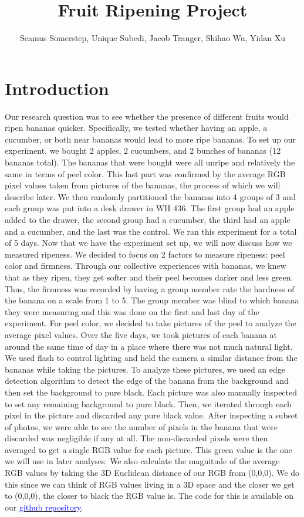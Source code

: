 \documentclass[
  12pt,
]{article}
\title{Fruit Ripening Project}
\author{Seamus Somerstep, Unique Subedi, Jacob Trauger, Shihao Wu, Yidan
Xu}
\date{}
\begin{document}
\maketitle

\hypertarget{introduction}{%
\section{Introduction}\label{introduction}}

Our research question was to see whether the presence of different
fruits would ripen bananas quicker. Specifically, we tested whether
having an apple, a cucumber, or both near bananas would lead to more
ripe bananas. To set up our experiment, we bought 2 apples, 2 cucumbers,
and 2 bunches of bananas (12 bananas total). The bananas that were
bought were all unripe and relatively the same in terms of peel color.
This last part was confirmed by the average RGB pixel values taken from
pictures of the bananas, the process of which we will describe later. We
then randomly partitioned the bananas into 4 groups of 3 and each group
was put into a desk drawer in WH 436. The first group had an apple added
to the drawer, the second group had a cucumber, the third had an apple
and a cucumber, and the last was the control. We ran this experiment for
a total of 5 days. Now that we have the experiment set up, we will now
discuss how we measured ripeness. We decided to focus on 2 factors to
measure ripeness: peel color and firmness. Through our collective
experiences with bananas, we knew that as they ripen, they get softer
and their peel becomes darker and less green. Thus, the firmness was
recorded by having a group member rate the hardness of the banana on a
scale from 1 to 5. The group member was blind to which banana they were
measuring and this was done on the first and last day of the experiment.
For peel color, we decided to take pictures of the peel to analyze the
average pixel values. Over the five days, we took pictures of each
banana at around the same time of day in a place where there was not
much natural light. We used flash to control lighting and held the
camera a similar distance from the bananas while taking the pictures. To
analyze these pictures, we used an edge detection algorithm to detect
the edge of the banana from the background and then set the background
to pure black. Each picture was also manually inspected to set any
remaining background to pure black. Then, we iterated through each pixel
in the picture and discarded any pure black value. After inspecting a
subset of photos, we were able to see the number of pixels in the banana
that were discarded was negligible if any at all. The non-discarded
pixels were then averaged to get a single RGB value for each picture.
This green value is the one we will use in later analyses. We also
calculate the magnitude of the average RGB values by taking the 3D
Euclidean distance of our RGB from (0,0,0). We do this since we can
think of RGB values living in a 3D space and the closer we get to
(0,0,0), the closer to black the RGB value is. The code for this is
available on our
\href{https://github.com/unique-subedi/fruit-ripening-experiment/blob/main/average_pixel.py}{\underline{\textcolor{blue}{ github repository}}}.
\end{document}
